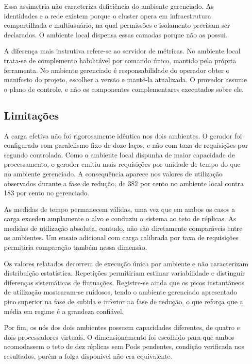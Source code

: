\documentclass[12pt]{article}
\begin{document}
Essa assimetria não caracteriza deficiência do ambiente gerenciado. As
identidades e a rede existem porque o cluster opera em infraestrutura
compartilhada e multiusuário, na qual permissões e isolamento precisam ser
declarados. O ambiente local dispensa essas camadas porque não as possui.

A diferença mais instrutiva refere-se ao servidor de métricas. No ambiente local
trata-se de complemento habilitável por comando único, mantido pela própria
ferramenta. No ambiente gerenciado é responsabilidade do operador obter o
manifesto do projeto, escolher a versão e mantê-la atualizada. O provedor assume
o plano de controle, e não os componentes complementares executados sobre ele.

\subsection{Limitações}

A carga efetiva não foi rigorosamente idêntica nos dois ambientes. O gerador foi
configurado com paralelismo fixo de doze laços, e não com taxa de requisições
por segundo controlada. Como o ambiente local dispunha de maior capacidade de
processamento, o gerador emitiu mais requisições por unidade de tempo do que no
ambiente gerenciado. A consequência aparece nos valores de utilização observados
durante a fase de redução, de 382 por cento no ambiente local contra 183 por
cento no gerenciado.

As medidas de tempo permanecem válidas, uma vez que em ambos os casos a carga
excedeu amplamente o alvo e conduziu o sistema ao teto de réplicas. As medidas
de utilização absoluta, contudo, não são diretamente comparáveis entre os
ambientes. Um ensaio adicional com carga calibrada por taxa de requisições
permitiria comparação também nessa dimensão.

Os valores relatados decorrem de execução única por ambiente e não caracterizam
distribuição estatística. Repetições permitiriam estimar variabilidade e
distinguir diferenças sistemáticas de flutuações. Registre-se ainda que os picos
instantâneos de utilização mostraram-se ruidosos, tendo o ambiente gerenciado
apresentado pico superior na fase de subida e inferior na fase de redução, o que
reforça que a média em regime é a grandeza confiável.

Por fim, os nós dos dois ambientes possuem capacidades diferentes, de quatro e
dois processadores virtuais. O dimensionamento foi escolhido para que ambos
acomodassem o teto de dez réplicas sem Pods pendentes, condição verificada nos
resultados, porém a folga disponível não era equivalente.
\end{document}
